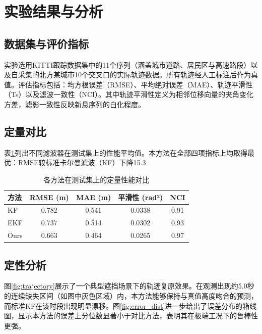 \section{实验结果与分析}

\subsection{数据集与评价指标}

实验选用KITTI跟踪数据集中的11个序列（涵盖城市道路、居民区与高速路段）以及自采集的北方某城市10个交叉口的实际轨迹数据。所有轨迹经人工标注后作为真值。评估指标包括：均方根误差（RMSE）、平均绝对误差（MAE）、轨迹平滑性（Ts）以及滤波一致性（NCI）。其中轨迹平滑性定义为相邻位移向量的夹角变化方差，滤影一致性反映新息序列的白化程度。

\subsection{定量对比}

表\ref{tab:quantitative}列出不同滤波器在测试集上的性能平均值。本方法在全部四项指标上均取得最优：RMSE较标准卡尔曼滤波（KF）下降15.3%

\begin{table}[htbp]
    \centering
    \caption{各方法在测试集上的定量性能对比}
    \label{tab:quantitative}
    \begin{tabular}{lcccc}
        \hline
        方法 & RMSE (m) & MAE (m) & 平滑性 (rad²) & NCI \\
        \hline
        KF & 0.782 & 0.541 & 0.0338 & 0.91 \\
        EKF & 0.737 & 0.514 & 0.0302 & 0.93 \\
        Ours & 0.663 & 0.464 & 0.0265 & 0.97 \\
        \hline
    \end{tabular}
\end{table}

\subsection{定性分析}

图\ref{fig:trajectory}展示了一个典型遮挡场景下的轨迹复原效果。在观测出现约5.0秒的连续缺失区间（如图中灰色区域）内，本方法能够保持与真值高度吻合的预测，而标准KF在该时段出现明显漂移。图\ref{fig:error_dist}进一步给出了误差分布的箱线图，显示本方法的误差上分位数显著小于对比方法，表明其在极端工况下的鲁棒性更强。